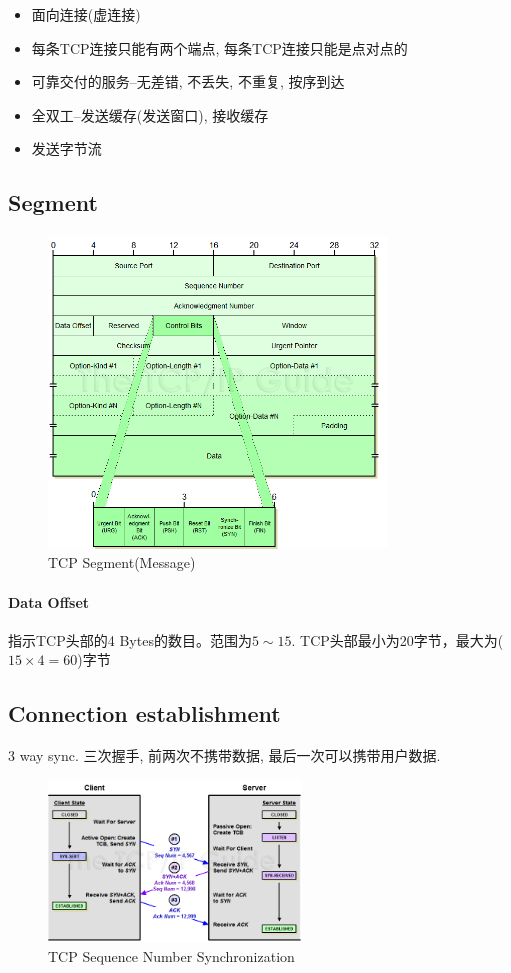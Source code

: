\documentclass[a4paper]{report}
\begin{document}
\begin{itemize}
  \item 面向连接(虚连接)
  \item 每条TCP连接只能有两个端点, 每条TCP连接只能是点对点的
  \item 可靠交付的服务--无差错, 不丢失, 不重复, 按序到达
  \item 全双工--发送缓存(发送窗口), 接收缓存
  \item 发送字节流
\end{itemize}

\subsection{Segment}
\begin{figure}[H]
\centering
\includegraphics[width=0.8\textwidth]{tcpsegmentformat.png}
\caption{TCP Segment(Message)}
\end{figure}
\paragraph{Data Offset}指示TCP头部的4 Bytes的数目。范围为$5\sim 15$. TCP头部最小为20字节，最大为($15\times4 = 60$)字节

\subsection{Connection establishment}
3 way sync. 三次握手, 前两次不携带数据, 最后一次可以携带用户数据. 
\begin{figure}[H]
\centering
\includegraphics[width=0.6\textwidth]{tcp3waysynch.png}
\caption{TCP Sequence Number Synchronization}
\end{figure}
\end{document}

